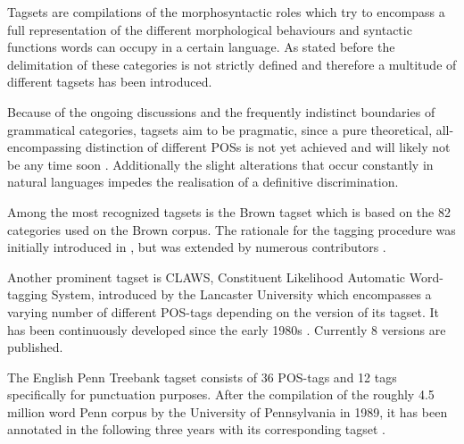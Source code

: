 Tagsets are compilations of the morphosyntactic roles which try to encompass a full representation of the different morphological behaviours and syntactic functions words can occupy in a certain language. 
As stated before the delimitation of these categories is not strictly defined and therefore a multitude of different tagsets has been introduced. 

Because of the ongoing discussions and the frequently indistinct boundaries of grammatical categories, tagsets aim to be pragmatic, since a pure theoretical, all-encompassing distinction of different POSs is not yet achieved and will likely not be any time soon \citep{westpfahl2020pos}. 
Additionally the slight alterations that occur constantly in natural languages impedes the realisation of a definitive discrimination.

Among the most recognized tagsets is the Brown tagset which is based on the 82 categories used on the Brown corpus. The rationale for the tagging procedure was initially introduced in \citealt{greene1971automatic}, but was extended by numerous contributors \citep{brown1979manual}. 

Another prominent tagset is CLAWS, Constituent Likelihood Automatic Word-tagging System, introduced by the Lancaster University which encompasses a varying number of different POS-tags depending on the version of its tagset. It has been continuously developed since the early 1980s \citep{garside1987claws}. Currently 8 versions are published.

The English Penn Treebank tagset consists of 36 POS-tags and 12 tags specifically for punctuation purposes. After the compilation of the roughly 4.5 million word Penn corpus by the University of Pennsylvania in 1989, it has been annotated in the following three years with its corresponding tagset \citep{marcinkiewicz1994building}.

